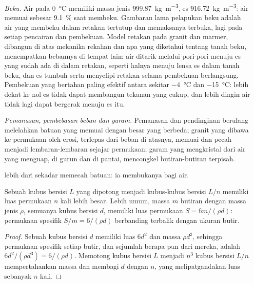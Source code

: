 \emph{Beku.} Air pada \qty{0}{\celsius} memiliki massa jenis \qty{999.87}{kg.m^{-3}}, es \qty{916.72}{kg.m^{-3}}: air memuai sebesar \qty{9.1}{\percent} saat membeku. Gambaran lama pelapukan beku adalah air yang membeku dalam retakan tertutup dan memaksanya terbuka, lagi pada setiap pencairan dan pembekuan. Model retakan pada granit dan marmer, dibangun di atas mekanika rekahan dan apa yang diketahui tentang tanah beku, menempatkan bebannya di tempat lain: air ditarik melalui pori-pori menuju es yang sudah ada di dalam retakan, seperti halnya menuju lensa es dalam tanah beku, dan es tumbuh serta menyelipi retakan selama pembekuan berlangsung. Pembekuan yang bertahan paling efektif antara sekitar \qty{-4}{\celsius} dan \qty{-15}{\celsius}: lebih dekat ke nol es tidak dapat membangun tekanan yang cukup, dan lebih dingin air tidak lagi dapat bergerak menuju es itu.

\emph{Pemanasan, pembebasan beban dan garam.} Pemanasan dan pendinginan berulang melelahkan batuan yang  memuai dengan besar yang berbeda; granit yang dibawa ke permukaan oleh erosi, terlepas dari beban di atasnya, memuai dan pecah menjadi lembaran-lembaran sejajar permukaan; garam yang mengkristal dari air yang menguap, di gurun dan di pantai, mencongkel butiran-butiran terpisah.

 lebih dari sekadar memecah batuan: ia membukanya bagi air.

\begin{proposition}\label{prop:b1:weathering-clays:surface}
Sebuah kubus bersisi $L$ yang dipotong menjadi kubus-kubus bersisi $L/n$ memiliki luas permukaan $n$ kali lebih besar. Lebih umum, massa $m$ butiran dengan massa jenis $\rho$, semuanya kubus bersisi $d$, memiliki luas permukaan $S = 6m/(\rho d)$: permukaan spesifik $S/m =
6/(\rho d)$ berbanding terbalik dengan ukuran butir.
\end{proposition}

\begin{proof}
Sebuah kubus bersisi $d$ memiliki luas $6d^2$ dan massa $\rho d^3$, sehingga permukaan spesifik setiap butir, dan sejumlah berapa pun dari mereka, adalah $6d^2/(\rho d^3)
= 6/(\rho d)$. Memotong kubus bersisi $L$ menjadi $n^3$ kubus bersisi $L/n$ mempertahankan massa dan membagi $d$ dengan $n$, yang melipatgandakan luas sebanyak $n$ kali.
\end{proof}


